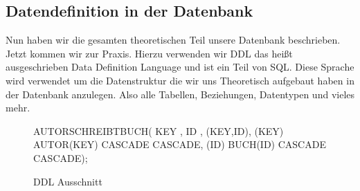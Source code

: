 \subsection{Datendefinition in der Datenbank}

Nun haben wir die gesamten theoretischen Teil unsere Datenbank beschrieben. Jetzt kommen wir zur Praxis. Hierzu verwenden wir DDL das heißt ausgeschrieben Data Definition Language und ist ein Teil von SQL. Diese Sprache wird verwendet um die Datenstruktur die wir uns Theoretisch aufgebaut haben in der Datenbank anzulegen. Also alle Tabellen, Beziehungen, Datentypen und vieles mehr. 

\begin{figure}[!htb]
	 AUTORSCHREIBTBUCH( \newline
	KEY  ,\newline
	ID         ,\newline
	(KEY,ID),\newline
	(KEY)  AUTOR(KEY)\newline
	 CASCADE  CASCADE,\newline
	(ID)  BUCH(ID)\newline
	 CASCADE  CASCADE);\newline
	\caption{DDL Ausschnitt}
	\label{fig:ddlbeispiel}
\end{figure}

